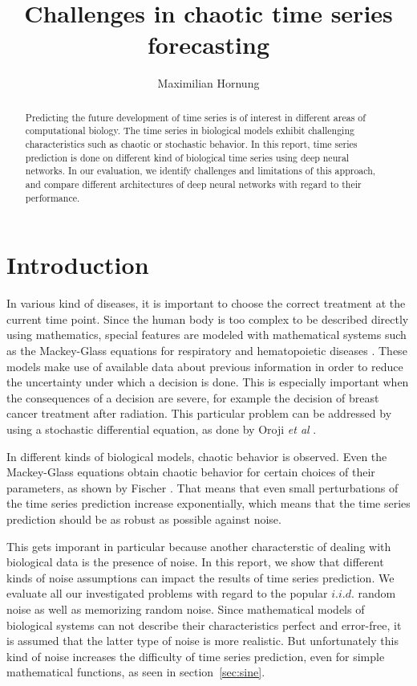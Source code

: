 \documentclass{article}
\title{Challenges in chaotic time series forecasting}
\author{Maximilian Hornung}
\begin{document}
\maketitle

\begin{abstract}
  Predicting the future development of time series is of interest in different
  areas of computational biology. The time series in biological models exhibit
  challenging characteristics such as chaotic or stochastic behavior. In this
  report, time series prediction is done on different kind of biological time
  series using deep neural networks. In our evaluation, we identify challenges
  and limitations of this approach, and compare different architectures of
  deep neural networks with regard to their performance.
\end{abstract}

\section{Introduction}

In various kind of diseases, it is important to choose the correct treatment at
the current time point. Since the human body is too complex to be described
directly using mathematics, special features are modeled with mathematical
systems such as the Mackey-Glass equations for respiratory and hematopoietic
diseases \cite{mackey1977}. These models make use of available data about
previous information in order to reduce the uncertainty under which a decision
is done. This is especially important when the consequences of a decision are
severe, for example the decision of breast cancer treatment after radiation.
This particular problem can be addressed by using a stochastic differential
equation, as done by Oroji \textit{et al} \cite{oroji2016}.

In different kinds of biological models, chaotic behavior is observed. Even the
Mackey-Glass equations obtain chaotic behavior for certain choices of their
parameters, as shown by Fischer \cite{farmer1982}. That means that even small
perturbations of the time series prediction increase exponentially, which means
that the time series prediction should be as robust as possible against noise.

This gets imporant in particular because another characterstic of dealing with
biological data is the presence of noise. In
this report, we show that different kinds of noise assumptions can impact the
results of time series prediction. We evaluate all our investigated problems
with regard to the popular $i.i.d.$ random noise as well as memorizing random
noise. Since mathematical models of biological systems can not describe their
characteristics perfect and error-free, it is assumed that the latter type of
noise is more realistic. But unfortunately this kind of noise increases the
difficulty of time series prediction, even for simple mathematical functions,
as seen in section~\ref{sec:sine}.
\end{document}
